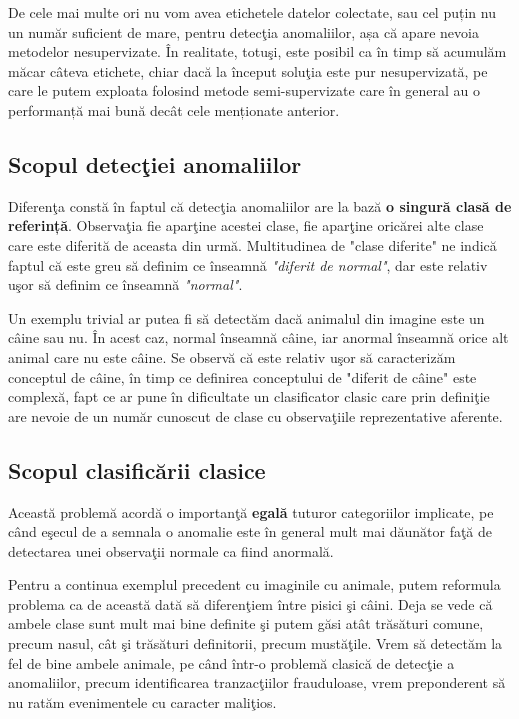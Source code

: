 De cele mai multe ori nu vom avea etichetele datelor colectate, sau 
cel puțin nu un număr suficient de mare, 
pentru detecţia anomaliilor, așa că apare nevoia metodelor nesupervizate. 
În realitate, totuşi, este posibil ca în timp să acumulăm măcar câteva etichete, chiar 
dacă la început soluţia este pur nesupervizată, pe care le putem 
exploata folosind metode semi-supervizate care în general au o performanță 
mai bună decât cele menționate anterior.

\subsection{Scopul detecţiei anomaliilor}

Diferenţa constă în faptul că detecţia anomaliilor are la bază \textbf{o singură clasă
de referință}. Observaţia fie aparţine acestei clase, fie aparţine oricărei alte clase 
care este diferită de aceasta din urmă. Multitudinea de "clase diferite" ne indică
faptul că este greu să definim ce înseamnă \textit{"diferit de normal"}, dar este relativ uşor
să definim ce înseamnă \textit{"normal"}.

Un exemplu trivial ar putea fi să detectăm dacă animalul din imagine este un câine sau nu.
În acest caz, normal înseamnă câine, iar anormal înseamnă orice alt animal care nu este
câine. Se observă că este relativ uşor să caracterizăm conceptul de câine, în timp ce 
definirea conceptului de "diferit de câine" este complexă, fapt ce ar pune în dificultate
un clasificator clasic care prin definiţie are nevoie de un număr cunoscut de clase 
cu observaţiile reprezentative aferente.

\subsection{Scopul clasificării clasice}

Această problemă acordă o importanţă \textbf{egală} tuturor categoriilor
implicate, pe când 
eşecul de a semnala o anomalie este în general mult mai dăunător faţă de 
detectarea unei observaţii normale ca fiind anormală. 

Pentru a continua exemplul precedent cu imaginile cu animale, putem reformula problema 
ca de această dată să diferenţiem între pisici şi câini. Deja se vede că ambele clase 
sunt mult mai bine definite şi putem găsi atât trăsături comune, precum nasul, cât şi 
trăsături definitorii, precum mustăţile. Vrem să detectăm la fel de bine ambele animale, 
pe când într-o problemă clasică de detecţie a anomaliilor, precum identificarea 
tranzacţiilor frauduloase, vrem preponderent să nu ratăm evenimentele cu 
caracter maliţios.

